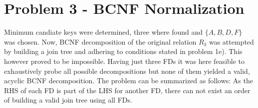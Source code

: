 \documentclass[a4paper,11pt,twoside]{article}
\begin{document}
\section*{Problem 3 - BCNF Normalization}
Minimum candiate keys were determined, three where found and $\{A,B,D,F\}$ was chosen. Now, BCNF decomposition of the original relation $R_3$ was attempted by building a join tree and adhering to conditions stated in problem 1e). This however proved to be impossible. Having just three FDs it was here feasible to exhaustively probe all possible decompositions but none of them yielded a valid, acyclic BCNF decomposition.
The problem can be summarized as follows: As the RHS of each FD is part of the LHS for another FD, there can not exist an order of building a valid join tree using all FDs.

%
\end{document}
